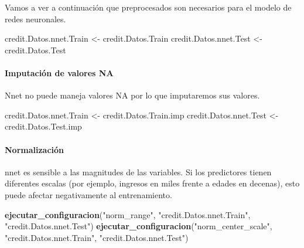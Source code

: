 \documentclass[
]{article}
\newenvironment{Shaded}{\begin{snugshade}}{\end{snugshade}}
\newcommand{\FunctionTok}[1]{\textcolor[rgb]{0.13,0.29,0.53}{\textbf{#1}}}
\newcommand{\NormalTok}[1]{#1}
\newcommand{\OtherTok}[1]{\textcolor[rgb]{0.56,0.35,0.01}{#1}}
\newcommand{\StringTok}[1]{\textcolor[rgb]{0.31,0.60,0.02}{#1}}
\begin{document}
Vamos a ver a continuación que preprocesados son necesarios para el
modelo de redes neuronales.

\begin{Shaded}
\begin{Highlighting}[]
\NormalTok{credit.Datos.nnet.Train }\OtherTok{\textless{}{-}}\NormalTok{ credit.Datos.Train}
\NormalTok{credit.Datos.nnet.Test }\OtherTok{\textless{}{-}}\NormalTok{ credit.Datos.Test}
\end{Highlighting}
\end{Shaded}

\hypertarget{imputaciuxf3n-de-valores-na}{%
\paragraph{Imputación de valores NA}\label{imputaciuxf3n-de-valores-na}}

Nnet no puede maneja valores NA por lo que imputaremos sus valores.

\begin{Shaded}
\begin{Highlighting}[]
\NormalTok{credit.Datos.nnet.Train }\OtherTok{\textless{}{-}}\NormalTok{ credit.Datos.Train.imp}
\NormalTok{credit.Datos.nnet.Test }\OtherTok{\textless{}{-}}\NormalTok{ credit.Datos.Test.imp}
\end{Highlighting}
\end{Shaded}

\hypertarget{normalizaciuxf3n}{%
\paragraph{Normalización}\label{normalizaciuxf3n}}

nnet es sensible a las magnitudes de las variables. Si los predictores
tienen diferentes escalas (por ejemplo, ingresos en miles frente a
edades en decenas), esto puede afectar negativamente al entrenamiento.

\begin{Shaded}
\begin{Highlighting}[]
\FunctionTok{ejecutar\_configuracion}\NormalTok{(}\StringTok{"norm\_range"}\NormalTok{, }\StringTok{"credit.Datos.nnet.Train"}\NormalTok{, }\StringTok{"credit.Datos.nnet.Test"}\NormalTok{)}
\FunctionTok{ejecutar\_configuracion}\NormalTok{(}\StringTok{"norm\_center\_scale"}\NormalTok{, }\StringTok{"credit.Datos.nnet.Train"}\NormalTok{, }\StringTok{"credit.Datos.nnet.Test"}\NormalTok{)}
\end{Highlighting}
\end{Shaded}
\end{document}
